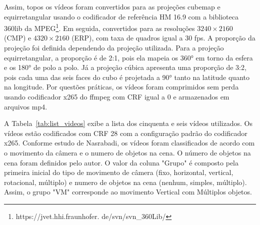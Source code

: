 Assim, topos os vídeos foram convertidos para as projeções cubemap e equirretangular usando o codificador de referência HM 16.9 com a biblioteca 360lib da MPEG\footnote{https://jvet.hhi.fraunhofer. de/svn/svn\_360Lib/}. Em seguida, convertidos para as resoluções $3240\times2160$ (CMP) e $4320\times2160$ (ERP), com taxa de quadros igual a 30 fps. A proporção da projeção foi definida dependendo da projeção utilizada. Para a projeção equirretangular, a proporção é de 2:1, pois ela mapeia os 360° em torno da esfera e os 180° de polo a polo. Já a projeção cúbica apresenta uma proporção de 3:2, pois cada uma das seis faces do cubo é projetada a 90° tanto na latitude quanto na longitude. Por questões práticas, os vídeos foram comprimidos sem perda usando codificador x265 do ffmpeg com CRF igual a 0 e armazenados em arquivos mp4.

A Tabela~\ref{tab:list_videos} exibe a lista dos cinquenta e seis vídeos utilizados. Os vídeos estão codificados com CRF 28 com a configuração padrão do codificador x265. Conforme estudo de Nasrabadi, os vídeos foram classificados de acordo com o movimento da câmera e o numero de objetos na cena. O número de objetos na cena foram definidos pelo autor. O valor da coluna "Grupo" é composto pela primeira inicial do tipo de movimento de câmera (fixo, horizontal, vertical, rotacional, múltiplo) e numero de objetos na cena (nenhum, simples, múltiplo). Assim, o grupo "VM" corresponde ao movimento Vertical com Múltiplos objetos.

